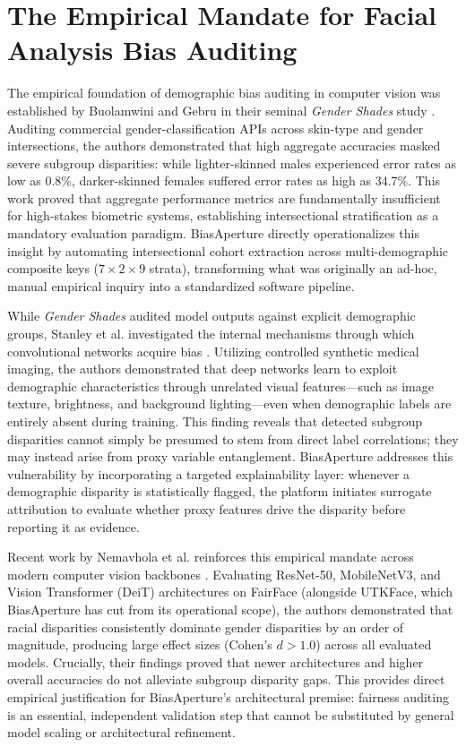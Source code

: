 \section{The Empirical Mandate for Facial Analysis Bias Auditing}
\label{sec:lit_empirical}

The empirical foundation of demographic bias auditing in computer vision was established by Buolamwini and Gebru in their seminal \emph{Gender Shades} study \cite{buolamwini2018gendershades}. Auditing commercial gender-classification APIs across skin-type and gender intersections, the authors demonstrated that high aggregate accuracies masked severe subgroup disparities: while lighter-skinned males experienced error rates as low as 0.8\%, darker-skinned females suffered error rates as high as 34.7\%. This work proved that aggregate performance metrics are fundamentally insufficient for high-stakes biometric systems, establishing intersectional stratification as a mandatory evaluation paradigm. BiasAperture directly operationalizes this insight by automating intersectional cohort extraction across multi-demographic composite keys ($7 \times 2 \times 9$ strata), transforming what was originally an ad-hoc, manual empirical inquiry into a standardized software pipeline.

While \emph{Gender Shades} audited model outputs against explicit demographic groups, Stanley et al. investigated the internal mechanisms through which convolutional networks acquire bias \cite{stanley2025bias}. Utilizing controlled synthetic medical imaging, the authors demonstrated that deep networks learn to exploit demographic characteristics through unrelated visual features---such as image texture, brightness, and background lighting---even when demographic labels are entirely absent during training. This finding reveals that detected subgroup disparities cannot simply be presumed to stem from direct label correlations; they may instead arise from proxy variable entanglement. BiasAperture addresses this vulnerability by incorporating a targeted explainability layer: whenever a demographic disparity is statistically flagged, the platform initiates surrogate attribution to evaluate whether proxy features drive the disparity before reporting it as evidence.

Recent work by Nemavhola et al. reinforces this empirical mandate across modern computer vision backbones \cite{nemavhola2026reassessing}. Evaluating ResNet-50, MobileNetV3, and Vision Transformer (DeiT) architectures on FairFace (alongside UTKFace, which BiasAperture has cut from its operational scope), the authors demonstrated that racial disparities consistently dominate gender disparities by an order of magnitude, producing large effect sizes (Cohen's $d > 1.0$) across all evaluated models. Crucially, their findings proved that newer architectures and higher overall accuracies do not alleviate subgroup disparity gaps. This provides direct empirical justification for BiasAperture's architectural premise: fairness auditing is an essential, independent validation step that cannot be substituted by general model scaling or architectural refinement.



